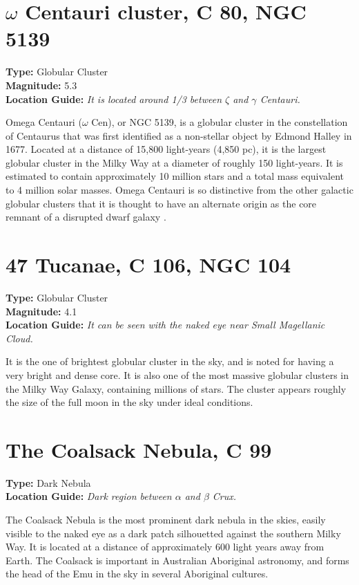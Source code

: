 \section{\texorpdfstring{$\omega$}{omega} Centauri cluster, C 80, NGC 5139}
\textbf{Type:} Globular Cluster \\
\textbf{Magnitude:} 5.3 \\ 
\textbf{Location Guide:} \textit{It is located around 1/3 between $\zeta$ and $\gamma$ Centauri.}

Omega Centauri ($\omega$ Cen), or NGC 5139, is a globular cluster in
the constellation of Centaurus that was first identified as a
non-stellar object by Edmond Halley in 1677. Located at a distance of
15,800 light-years (4,850 pc), it is the largest globular cluster in
the Milky Way at a diameter of roughly 150 light-years. It is
estimated to contain approximately 10 million stars and a total mass
equivalent to 4 million solar masses. Omega Centauri is so distinctive
from the other galactic globular clusters that it is thought to have
an alternate origin as the core remnant of a disrupted dwarf galaxy
\citep{2008ApJ...676.1008N}.

\section{47 Tucanae, C 106, NGC 104}
\textbf{Type:} Globular Cluster \\
\textbf{Magnitude:} 4.1 \\ 
\textbf{Location Guide:} \textit{It can be seen with the naked eye near Small Magellanic Cloud.}

It is the one of brightest globular cluster in the sky, and is noted
for having a very bright and dense core. It is also one of the most
massive globular clusters in the Milky Way Galaxy, containing millions of
stars. The cluster appears roughly the size of the full moon in the
sky under ideal conditions.

\section{The Coalsack Nebula, C 99}
\textbf{Type:} Dark Nebula \\
\textbf{Location Guide:} \textit{Dark region between $\alpha$ and $\beta$ Crux.}

The Coalsack Nebula is the most prominent dark nebula in the skies,
easily visible to the naked eye as a dark patch silhouetted against
the southern Milky Way. It is located at a distance of approximately
600 light years away from Earth. The Coalsack is important in
Australian Aboriginal astronomy, and forms the head of the Emu in the
sky in several Aboriginal cultures.

